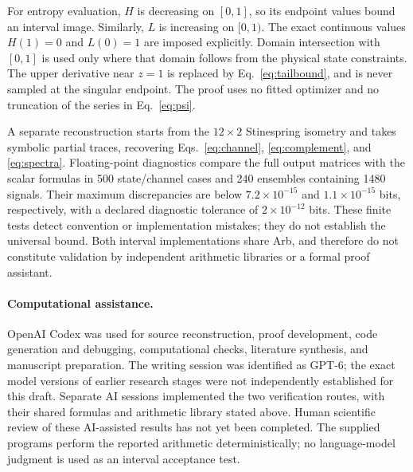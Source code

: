 \documentclass[aps,pra,reprint,amsmath,amssymb,longbibliography,nofootinbib]{revtex4-2}
\begin{document}
For entropy evaluation, $H$ is decreasing on $[0,1]$, so its endpoint values bound an interval image. Similarly, $L$ is increasing on $[0,1)$. The exact continuous values $H(1)=0$ and $L(0)=1$ are imposed explicitly. Domain intersection with $[0,1]$ is used only where that domain follows from the physical state constraints. The upper derivative near $z=1$ is replaced by Eq.~\eqref{eq:tailbound}, and is never sampled at the singular endpoint. The proof uses no fitted optimizer and no truncation of the series in Eq.~\eqref{eq:psi}.

A separate reconstruction starts from the $12\times2$ Stinespring isometry and takes symbolic partial traces, recovering Eqs.~\eqref{eq:channel}, \eqref{eq:complement}, and \eqref{eq:spectra}. Floating-point diagnostics compare the full output matrices with the scalar formulas in 500 state/channel cases and 240 ensembles containing 1480 signals. Their maximum discrepancies are below $7.2\times10^{-15}$ and $1.1\times10^{-15}$ bits, respectively, with a declared diagnostic tolerance of $2\times10^{-12}$ bits. These finite tests detect convention or implementation mistakes; they do not establish the universal bound. Both interval implementations share Arb, and therefore do not constitute validation by independent arithmetic libraries or a formal proof assistant.

\paragraph{Computational assistance.}
OpenAI Codex was used for source reconstruction, proof development, code generation and debugging, computational checks, literature synthesis, and manuscript preparation. The writing session was identified as GPT-6; the exact model versions of earlier research stages were not independently established for this draft. Separate AI sessions implemented the two verification routes, with their shared formulas and arithmetic library stated above. Human scientific review of these AI-assisted results has not yet been completed. The supplied programs perform the reported arithmetic deterministically; no language-model judgment is used as an interval acceptance test.
\end{document}

